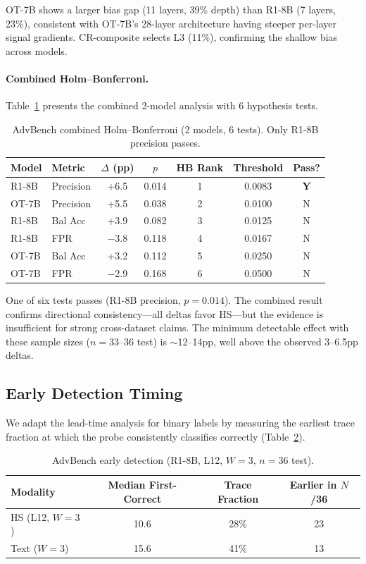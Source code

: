 \documentclass[11pt]{article}
\begin{document}
OT-7B shows a larger bias gap (11 layers, 39\% depth) than R1-8B (7 layers, 23\%), consistent with OT-7B's 28-layer architecture having steeper per-layer signal gradients. CR-composite selects L3 (11\%), confirming the shallow bias across models.

\paragraph{Combined Holm--Bonferroni.} Table~\ref{tab:combined-hb} presents the combined 2-model analysis with 6 hypothesis tests.

\begin{table}[t]
\centering
\small
\caption{AdvBench combined Holm--Bonferroni (2 models, 6 tests). Only R1-8B precision passes.}
\label{tab:combined-hb}
\begin{tabular}{llccccc}
\toprule
Model & Metric & $\Delta$ (pp) & $p$ & HB Rank & Threshold & Pass? \\
\midrule
R1-8B & Precision & +6.5 & 0.014 & 1 & 0.0083 & \textbf{Y} \\
OT-7B & Precision & +5.5 & 0.038 & 2 & 0.0100 & N \\
R1-8B & Bal Acc & +3.9 & 0.082 & 3 & 0.0125 & N \\
R1-8B & FPR & $-$3.8 & 0.118 & 4 & 0.0167 & N \\
OT-7B & Bal Acc & +3.2 & 0.112 & 5 & 0.0250 & N \\
OT-7B & FPR & $-$2.9 & 0.168 & 6 & 0.0500 & N \\
\bottomrule
\end{tabular}
\end{table}

One of six tests passes (R1-8B precision, $p{=}0.014$). The combined result confirms directional consistency---all deltas favor HS---but the evidence is insufficient for strong cross-dataset claims. The minimum detectable effect with these sample sizes ($n{=}33$--36 test) is $\sim$12--14pp, well above the observed 3--6.5pp deltas.

\subsection{Early Detection Timing}

We adapt the lead-time analysis for binary labels by measuring the earliest trace fraction at which the probe consistently classifies correctly (Table~\ref{tab:early-detection}).

\begin{table}[t]
\centering
\small
\caption{AdvBench early detection (R1-8B, L12, $W{=}3$, $n{=}36$ test).}
\label{tab:early-detection}
\begin{tabular}{lccc}
\toprule
Modality & Median First-Correct & Trace Fraction & Earlier in $N$/36 \\
\midrule
HS (L12, $W{=}3$) & 10.6 & 28\% & 23 \\
Text ($W{=}3$) & 15.6 & 41\% & 13 \\
\bottomrule
\end{tabular}
\end{table}
\end{document}
